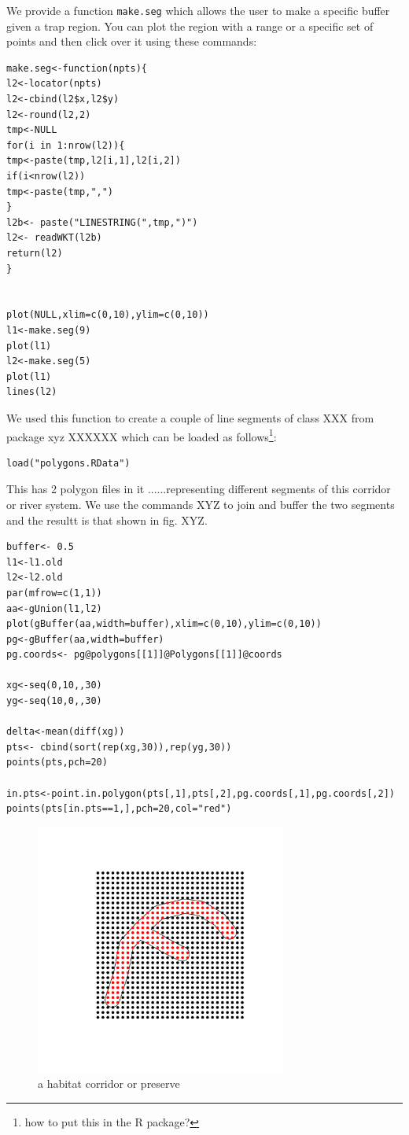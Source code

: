 We provide 
 a function \mbox{\tt make.seg} which allows the user to make a specific
buffer given a trap region.  You can plot the region with a range or a
specific set of points and then click over it using these commands:
{\small 
\begin{verbatim}
make.seg<-function(npts){
l2<-locator(npts)
l2<-cbind(l2$x,l2$y)
l2<-round(l2,2)
tmp<-NULL
for(i in 1:nrow(l2)){
tmp<-paste(tmp,l2[i,1],l2[i,2])
if(i<nrow(l2))
tmp<-paste(tmp,",")
}
l2b<- paste("LINESTRING(",tmp,")")
l2<- readWKT(l2b)
return(l2)
}


plot(NULL,xlim=c(0,10),ylim=c(0,10))
l1<-make.seg(9)
plot(l1)
l2<-make.seg(5)
plot(l1)
lines(l2)
\end{verbatim}
}
We used this function to create a couple of line segments of class XXX
from package xyz XXXXXX  which can be loaded as 
follows\footnote{how to put this in the R package?}:
\begin{verbatim}
load("polygons.RData")
\end{verbatim}
This has 2 polygon files in it ......representing different segments
of this corridor or river system. We use the commands XYZ to join and
buffer the two segments and the resultt is that shown in fig. XYZ.

\begin{verbatim}
buffer<- 0.5
l1<-l1.old
l2<-l2.old
par(mfrow=c(1,1))
aa<-gUnion(l1,l2)
plot(gBuffer(aa,width=buffer),xlim=c(0,10),ylim=c(0,10))
pg<-gBuffer(aa,width=buffer)
pg.coords<- pg@polygons[[1]]@Polygons[[1]]@coords

xg<-seq(0,10,,30)
yg<-seq(10,0,,30)

delta<-mean(diff(xg))
pts<- cbind(sort(rep(xg,30)),rep(yg,30))
points(pts,pch=20)

in.pts<-point.in.polygon(pts[,1],pts[,2],pg.coords[,1],pg.coords[,2])
points(pts[in.pts==1,],pch=20,col="red")

\end{verbatim}

\begin{figure}
\begin{center}
\includegraphics[height=3.25in,width=3.25in]{Ch10/figs/corridor}
\end{center}
\caption{a habitat corridor or preserve}
\label{ecoldist.fig.corridor}
\end{figure}


